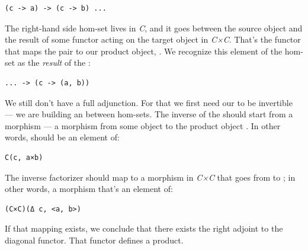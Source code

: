 \begin{Verbatim}[commandchars=\\\{\}]
(c -> a) -> (c -> b) ...
\end{Verbatim}
The right-hand side hom-set lives in \emph{C}, and it goes between the
source object  and the result of some functor 
acting on the target object in \emph{C×C}. That's the functor that maps
the pair  to our product object,
. We recognize this element of the hom-set as the
\emph{result} of the :

\begin{Verbatim}[commandchars=\\\{\}]
... -> (c -> (a, b))
\end{Verbatim}

\begin{figure}[H]
\centering
{}
\end{figure}

\noindent
We still don't have a full adjunction. For that we first need our
 to be invertible --- we are building an
 between hom-sets. The inverse of the
 should start from a morphism  --- a
morphism from some object  to the product object .
In other words,  should be an element of:

\begin{Verbatim}[commandchars=\\\{\}]
C(c, a×b)
\end{Verbatim}
The inverse factorizer should map  to a morphism
 in \emph{C×C} that goes from
 to
; in other words, a morphism
that's an element of:

\begin{Verbatim}[commandchars=\\\{\}]
(C×C)(Δ c, <a, b>)
\end{Verbatim}
If that mapping exists, we conclude that there exists the right adjoint
to the diagonal functor. That functor defines a product.

